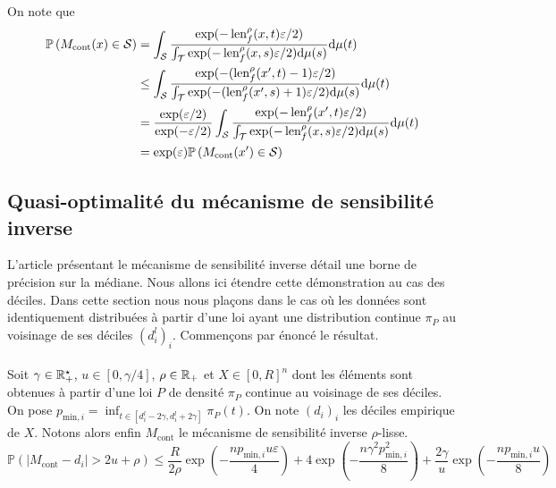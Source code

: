 On note que 
\begin{align*}
    \mathbb P\left( M_{\text{cont}}(x) \in \mathcal S \right) & = \int_\mathcal S \dfrac{\exp(-\operatorname{len}_f^\rho(x, t)\varepsilon/2)}{\int_\mathcal T \exp(-\operatorname{len}_f^\rho(x, s)\varepsilon/2)\mathrm{d} \mu(s)}    \mathrm{d} \mu(t)\\
    & \leq \int_\mathcal S \dfrac{\exp(-(\operatorname{len}_f^\rho(x', t)-1)\varepsilon/2)}{\int_\mathcal T \exp(-(\operatorname{len}_f^\rho(x', s)+1)\varepsilon/2)\mathrm{d} \mu(s)}    \mathrm{d} \mu(t)\\
    & = \dfrac{\exp(\varepsilon/2)}{\exp(-\varepsilon/2)}\int_\mathcal S \dfrac{\exp(-\operatorname{len}_f^\rho(x', t)\varepsilon/2)}{\int_\mathcal T \exp(-\operatorname{len}_f^\rho(x, s)\varepsilon/2)\mathrm{d} \mu(s)}    \mathrm{d} \mu(t)\\
    & = \exp(\varepsilon) \mathbb P\left( M_{\text{cont}}(x') \in \mathcal S \right)
\end{align*}


\subsection{Quasi-optimalité du mécanisme de sensibilité inverse}



L'article présentant le mécanisme de sensibilité inverse \cite{Asi2020NearII} détail une borne de précision sur la médiane. Nous allons ici étendre cette démonstration au cas des déciles. Dans cette section nous nous plaçons dans le cas où les données sont identiquement distribuées à partir d'une loi ayant une distribution continue \(\pi_P\) au voisinage de ses déciles \((d_i^l)_i\). Commençons par énoncé le résultat.\\

\theoreme{}\\
Soit \(\gamma \in \mathbb{R}_+^\star\), \(u \in [0, \gamma/4]\), \(\rho \in \mathbb{R}_+\) et \(X \in [0,R]^n\) dont les éléments sont obtenues à partir d'une loi \(P\) de densité \(\pi_P\) continue au voisinage de ses déciles. On pose \(p_{\text{min}, i} = \inf_{t \in [d_i^l - 2\gamma, d_i^l + 2\gamma]} \pi_P(t)\). On note \((d_i)_i\) les déciles empirique de \(X\). Notons alors enfin \(M_{\text{cont}}\) le mécanisme de sensibilité inverse \(\rho\)-lisse.
\[
    \mathbb P\left( |M_{\text{cont}} - d_i| > 2u + \rho\right) \leq \dfrac{R}{2\rho}\exp\left(- \dfrac{np_{\text{min}, i}u\varepsilon}{4} \right) + 4\exp\left(- \dfrac{n\gamma^2p_{\text{min},i}^2}{8} \right) + \dfrac{2\gamma}{u}\exp\left( -\dfrac{np_{\text{min},i}u}{8} \right)
\]


